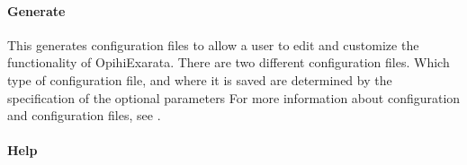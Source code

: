 \documentclass[letterpaper,11pt,english]{sphinxmanual}
\begin{document}
\paragraph{Generate}
\label{\detokenize{user/command_line:generate}}\label{\detokenize{user/command_line:user-command-line-available-actions-generate}}

\begin{savenotes}\begin{fulllineitems}
\label{\detokenize{user/command_line:cmdoption-arg-generate}}
\pysigstartsignatures
{}
\pysigstopsignatures
\end{fulllineitems}\end{savenotes}


\sphinxAtStartPar
This generates configuration files to allow a user to edit and customize the
functionality of OpihiExarata. There are two different configuration files.
Which type of configuration file, and where it is saved are determined by the
specification of the optional parameters
For more information about configuration and configuration files, see
{\hyperref[\detokenize{user/configuration:user-configuration}]{}}.


\paragraph{Help}
\label{\detokenize{user/command_line:help}}\label{\detokenize{user/command_line:user-command-line-available-actions-help}}

\begin{savenotes}\begin{fulllineitems}
\label{\detokenize{user/command_line:cmdoption-arg-help}}
\pysigstartsignatures
{}
\pysigstopsignatures
\end{fulllineitems}\end{savenotes}
\end{document}
